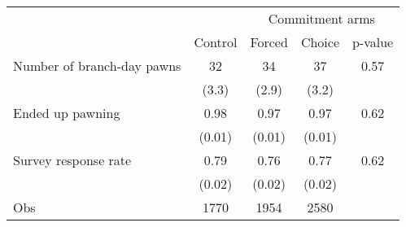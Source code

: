 \begin{tabular}{lcccc}
\toprule
      &       & \multicolumn{3}{c}{Commitment arms} \\
\cmidrule{3-5}      & Control & Forced & Choice & p-value \\
\midrule
\midrule
Number of branch-day pawns & 32    & 34    & 37    & 0.57 \\
      & (3.3) & (2.9) & (3.2) &  \\
\multicolumn{1}{p{12.82em}}{Ended up pawning} & 0.98  & 0.97  & 0.97  & 0.62 \\
      & (0.01) & (0.01) & (0.01) &  \\
Survey response rate & 0.79  & 0.76  & 0.77  & 0.62 \\
      & (0.02) & (0.02) & (0.02) &  \\
\midrule
Obs   & 1770  & 1954  & 2580  &  \\
\bottomrule
\bottomrule
\end{tabular}%
